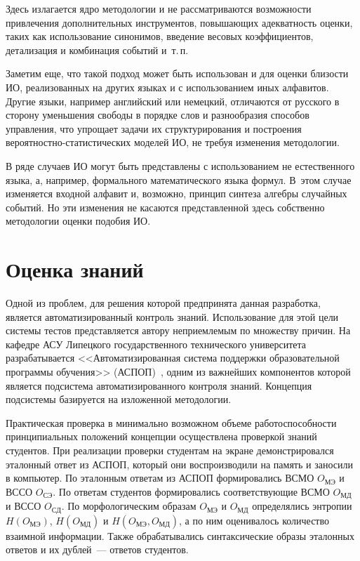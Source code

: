 \begin{multicols}{2}
   Здесь излагается ядро методологии и не рассматриваются возможности 
привлечения дополнительных инструментов, повышающих адекватность 
оценки, таких как использование синонимов, введение весовых 
коэффициентов, детализация и комбинация событий и~т.\,п. 
   
   Заметим еще, что такой подход может быть использован и для оценки 
близости ИО, реализованных на других языках и с использованием иных 
алфавитов. Другие языки, например английский или немецкий, отличаются 
от русского в сторону уменьшения свободы в порядке слов и разнообразия 
способов управления, что упрощает задачи их структурирования и 
построения вероятностно-ста\-ти\-сти\-че\-ских моделей ИО, не требуя изменения 
методологии. 
   
   В ряде случаев ИО могут быть представлены с использованием не 
естественного языка, а, например, формального математического языка 
формул. В~этом случае изменяется входной алфавит и, возможно, принцип 
синтеза алгебры случайных событий. Но эти изменения не касаются 
представленной здесь собственно методологии оценки подобия ИО. 

\vspace*{-6pt}
   
\section{Оценка знаний}

\vspace*{-2pt}
   
   Одной из проблем, для решения которой предпринята данная разработка, 
является автоматизированный контроль знаний. Использование для этой 
цели системы тестов представляется автору неприемлемым по множеству 
причин. На кафедре АСУ Липецкого государственного технического 
университета разрабатывается <<Автоматизированная система поддержки 
образовательной программы обучения>> (АСПОП)~\cite{14-k}, одним из 
важнейших компонентов которой является подсистема автоматизированного 
контроля знаний. Концепция подсистемы базируется на изложенной 
методологии. 
   
   Практическая проверка в минимально возможном объеме 
работоспособности принципиальных положений концепции осуществлена 
проверкой знаний студентов. При реализации проверки студентам на экране 
демонстрировался эталонный ответ из АСПОП, который они воспроизводили 
на память и заносили в компьютер. По эталонным ответам из АСПОП 
формировались ВСМО $O_{\mathrm{МЭ}}$ и ВССО $O_{\mathrm{СЭ}}$. По 
ответам студентов формировались соответствующие ВСМО 
$O_{\mathrm{МД}}$ и ВССО $O_{\mathrm{СД}}$. По морфологическим образам 
$O_{\mathrm{МЭ}}$ и $O_{\mathrm{МД}}$ определялись энтропии 
$H(O_{\mathrm{МЭ}})$, $H(O_{\mathrm{МД}})$ и $H(O_{\mathrm{МЭ}}, 
O_{\mathrm{МД}})$, а по ним оценивалось количество взаимной информации. 
Также обрабатывались синтаксические образы эталонных ответов и их 
дублей~--- ответов студентов. 
   

\end{multicols}
